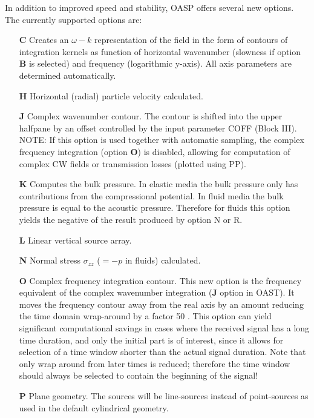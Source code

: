     In  addition  to improved speed and  stability,  OASP  offers 
several new options. The currently supported options are:
\begin{itemize}
    \item[{\bf C}] Creates an $ \omega - k$ representation of the
      field in the form of contours of integration kernels as function
      of horizontal wavenumber (slowness if option {\bf B} is
      selected) and frequency (logarithmic y-axis). All axis
      parameters are determined automatically.  
\item[{\bf H}]
      Horizontal (radial) particle velocity calculated.  
\item[{\bf J}] Complex wavenumber contour. The contour is shifted into the
      upper halfpane by an offset controlled by the input parameter
      COFF (Block III). NOTE: If this option is used together with
      automatic sampling, the complex frequency integration (option
      {\bf O}) is disabled, allowing for computation of complex CW
      fields or transmission losses (plotted using PP). 
\item[{\bf K}]
      Computes the bulk pressure. In elastic media the bulk pressure only
      has contributions from the compressional potential. In fluid
      media the bulk pressure is equal to the acoustic pressure.
      Therefore for fluids this option yields the negative of the result
      produced by option N or R.  
\item[{\bf L}] Linear vertical source array.
\item[{\bf N}] Normal stress $\sigma_{zz}$ ($=-p$ in fluids)
      calculated.  
\item[{\bf O}] Complex frequency integration
      contour. This new option is the frequency equivalent of the
      complex wavenumber integration ({\bf J} option in OAST). It
      moves the frequency contour away from the real axis by an amount
      reducing the time domain wrap-around by a factor 50
      \cite{jkps}. This option can yield significant computational
      savings in cases where the received signal has a long time
      duration, and only the initial part is of interest, since it
      allows for selection of a time window shorter than the actual
      signal duration. Note that only wrap around from later times is
      reduced; therefore the time window should always be selected to
      contain the beginning of the signal!  
\item[{\bf P}] Plane
      geometry. The sources will be line-sources instead of
      point-sources as used in the default cylindrical geometry.

\end{itemize}

